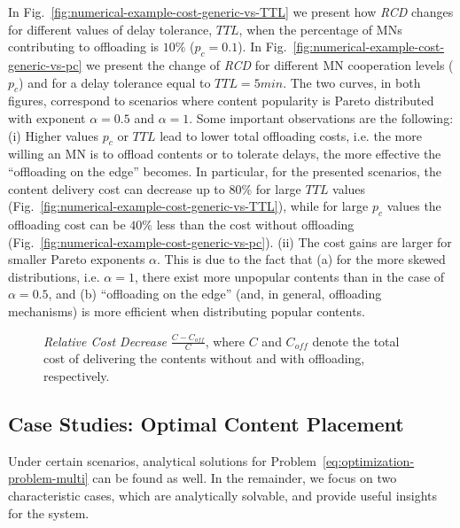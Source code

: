 \documentclass[10pt,conference,letterpaper]{IEEEtran}
\begin{document}
In Fig.~\ref{fig:numerical-example-cost-generic-vs-TTL} we present how \textit{RCD} changes for different values of delay tolerance, $TTL$, when the percentage of MNs contributing to offloading is $10\%$ ($p_{c}=0.1$). In Fig.~\ref{fig:numerical-example-cost-generic-vs-pc} we present the change of \textit{RCD} for different MN cooperation levels ($p_{c}$) and for a delay tolerance equal to $TTL=5min$. The two curves, in both figures, correspond to scenarios where content popularity is Pareto distributed with exponent $\alpha=0.5$ and $\alpha = 1$. Some important observations are the following: (i) Higher values $p_{c}$ or $TTL$ lead to lower total offloading costs, i.e. the more willing an MN is to offload contents or to tolerate delays, the more effective the ``offloading on the edge'' becomes. In particular, for the presented scenarios, the content delivery cost can decrease up to $80\%$ for large $TTL$ values (Fig.~\ref{fig:numerical-example-cost-generic-vs-TTL}), while for large $p_{c}$ values the offloading cost can be $40\%$ less than the cost without offloading (Fig.~\ref{fig:numerical-example-cost-generic-vs-pc}). (ii) The cost gains are larger for smaller Pareto exponents $\alpha$. This is due to the fact that (a) for the more skewed distributions, i.e. $\alpha=1$, there exist more unpopular contents than in the case of $\alpha=0.5$, and (b) ``offloading on the edge'' (and, in general, offloading mechanisms) is more efficient when distributing popular contents.




\begin{figure}
\caption{\textit{Relative Cost Decrease} $\frac{C-C_{off}}{C}$, where $C$ and $C_{off}$ denote the total cost of delivering the contents without and with offloading, respectively.}
\label{fig:numerical-example-cost-generic}
\end{figure}


\subsection{Case Studies: Optimal Content Placement}

Under certain scenarios, analytical solutions for Problem~\ref{eq:optimization-problem-multi} can be found as well. In the remainder, we focus on two characteristic cases, which are analytically solvable, and provide useful insights for the system.
\end{document}
